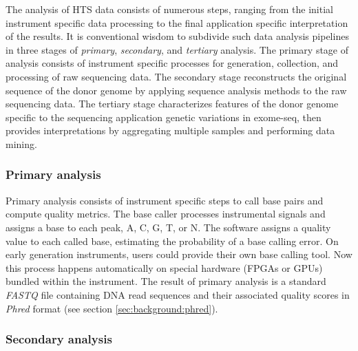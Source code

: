 The analysis of HTS data consists of numerous steps, ranging from the initial instrument specific data processing to the final application specific interpretation of the results.
It is conventional wisdom to subdivide such data analysis pipelines in three stages of \emph{primary}, \emph{secondary}, and \emph{tertiary} analysis.
The primary stage of analysis consists of instrument specific processes for generation, collection, and processing of raw sequencing data.
The secondary stage reconstructs the original sequence of the donor genome by applying sequence analysis methods to the raw sequencing data.
The tertiary stage characterizes features of the donor genome specific to the sequencing application \eg genetic variations in exome-seq, then provides interpretations \eg by aggregating multiple samples and performing data mining.


\subsubsection{Primary analysis}

Primary analysis consists of instrument specific steps to call base pairs and compute quality metrics.
The base caller processes instrumental signals and assigns a base to each peak, \ie A, C, G, T, or N.
The software assigns a quality value to each called base, estimating the probability of a base calling error.
On early generation instruments, users could provide their own base calling tool.
Now this process happens automatically on special hardware (\eg FPGAs or GPUs) bundled within the instrument.
The result of primary analysis is a standard \emph{FASTQ} file containing DNA read sequences and their associated quality scores in \emph{Phred} format (see section \ref{sec:background:phred}).

\subsubsection{Secondary analysis}

